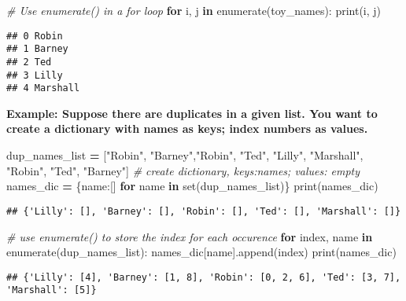 \documentclass[
]{book}
\newenvironment{Shaded}{\begin{snugshade}}{\end{snugshade}}
\newcommand{\BuiltInTok}[1]{#1}
\newcommand{\CommentTok}[1]{\textcolor[rgb]{0.56,0.35,0.01}{\textit{#1}}}
\newcommand{\ControlFlowTok}[1]{\textcolor[rgb]{0.13,0.29,0.53}{\textbf{#1}}}
\newcommand{\KeywordTok}[1]{\textcolor[rgb]{0.13,0.29,0.53}{\textbf{#1}}}
\newcommand{\NormalTok}[1]{#1}
\newcommand{\OperatorTok}[1]{\textcolor[rgb]{0.81,0.36,0.00}{\textbf{#1}}}
\newcommand{\StringTok}[1]{\textcolor[rgb]{0.31,0.60,0.02}{#1}}
\begin{document}
\begin{Shaded}
\begin{Highlighting}[]
\CommentTok{\# Use enumerate() in a for loop}
\ControlFlowTok{for}\NormalTok{ i, j }\KeywordTok{in} \BuiltInTok{enumerate}\NormalTok{(toy\_names):}
  \BuiltInTok{print}\NormalTok{(i, j)}
\end{Highlighting}
\end{Shaded}

\begin{verbatim}
## 0 Robin
## 1 Barney
## 2 Ted
## 3 Lilly
## 4 Marshall
\end{verbatim}

\textbf{Example: Suppose there are duplicates in a given list. You want to create a dictionary with names as keys; index numbers as values.}

\begin{Shaded}
\begin{Highlighting}[]
\NormalTok{dup\_names\_list }\OperatorTok{=}\NormalTok{ [}\StringTok{"Robin"}\NormalTok{, }\StringTok{"Barney"}\NormalTok{,}\StringTok{"Robin"}\NormalTok{, }\StringTok{"Ted"}\NormalTok{, }\StringTok{"Lilly"}\NormalTok{, }\StringTok{"Marshall"}\NormalTok{, }\StringTok{"Robin"}\NormalTok{, }\StringTok{"Ted"}\NormalTok{, }\StringTok{"Barney"}\NormalTok{]}
\CommentTok{\# create dictionary, keys:names; values: empty}
\NormalTok{names\_dic }\OperatorTok{=}\NormalTok{ \{name:[] }\ControlFlowTok{for}\NormalTok{ name }\KeywordTok{in} \BuiltInTok{set}\NormalTok{(dup\_names\_list)\}}
\BuiltInTok{print}\NormalTok{(names\_dic)}
\end{Highlighting}
\end{Shaded}

\begin{verbatim}
## {'Lilly': [], 'Barney': [], 'Robin': [], 'Ted': [], 'Marshall': []}
\end{verbatim}

\begin{Shaded}
\begin{Highlighting}[]
\CommentTok{\# use enumerate() to store the index for each occurence}
\ControlFlowTok{for}\NormalTok{ index, name }\KeywordTok{in} \BuiltInTok{enumerate}\NormalTok{(dup\_names\_list):}
\NormalTok{  names\_dic[name].append(index)}
\BuiltInTok{print}\NormalTok{(names\_dic)}
\end{Highlighting}
\end{Shaded}

\begin{verbatim}
## {'Lilly': [4], 'Barney': [1, 8], 'Robin': [0, 2, 6], 'Ted': [3, 7], 'Marshall': [5]}
\end{verbatim}
\end{document}
